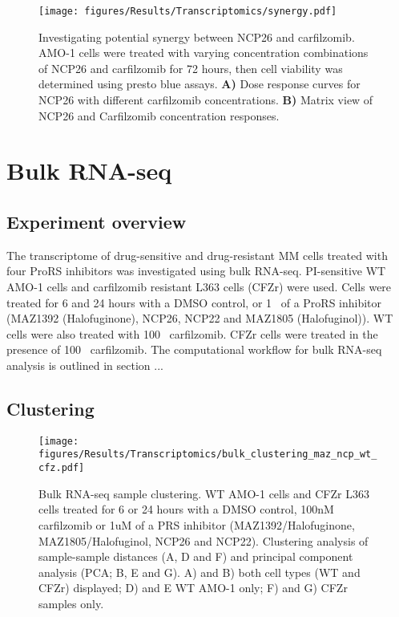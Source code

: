 \begin{figure}[h]
\centering
\texttt{[image: figures/Results/Transcriptomics/synergy.pdf]}
\caption[NCP26 and carfilzomib synergism]{Investigating potential synergy between NCP26 and carfilzomib.
AMO-1 cells were treated with varying concentration combinations of NCP26 and carfilzomib for 72 hours, then cell viability was determined using presto blue assays.
\textbf{A)} Dose response curves for NCP26 with different carfilzomib concentrations.
\textbf{B)} Matrix view of NCP26 and Carfilzomib concentration responses.
}
\label{fig:synergy}\end{figure}

\clearpage

\section{Bulk RNA-seq}

\subsection{Experiment overview}
The transcriptome of drug-sensitive and drug-resistant MM cells treated with four ProRS inhibitors was investigated using bulk RNA-seq.
PI-sensitive WT AMO-1 cells and carfilzomib resistant L363 cells (CFZr) were used.
Cells were treated for 6 and 24 hours with a DMSO control, or 1\si{\micro\Molar} of a ProRS inhibitor (MAZ1392 (Halofuginone), NCP26, NCP22 and MAZ1805 (Halofuginol)).
WT cells were also treated with 100\si{\nano\Molar} carfilzomib.
CFZr cells were treated in the presence of 100\si{\nano\Molar} carfilzomib.
The computational workflow for bulk RNA-seq analysis is outlined in section ...

\subsection{Clustering}

\begin{figure}[p]
\centering
\texttt{[image: figures/Results/Transcriptomics/bulk\_clustering\_maz\_ncp\_wt\_cfz.pdf]}
\caption[Bulk RNA-seq sample clustering]{Bulk RNA-seq sample clustering.
WT AMO-1 cells and CFZr L363 cells treated for 6 or 24 hours with a DMSO control, 100nM carfilzomib or 1uM of a PRS inhibitor (MAZ1392/Halofuginone, MAZ1805/Halofuginol, NCP26 and NCP22).
Clustering analysis of sample-sample distances (A, D and F) and principal component analysis (PCA; B, E and G).
A) and B) both cell types (WT and CFZr) displayed; D) and E WT AMO-1 only; F) and G) CFZr samples only.
}
\label{fig:clustering_bulk}\end{figure}

